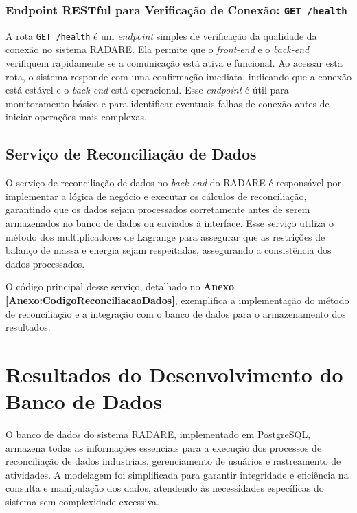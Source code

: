\subsubsection{Endpoint RESTful para Verificação de Conexão: \texttt{GET /health}}

A rota \texttt{GET /health} é um \textit{endpoint} simples de verificação da qualidade da conexão no sistema RADARE. Ela permite que o \textit{front-end} e o \textit{back-end} verifiquem rapidamente se a comunicação está ativa e funcional. Ao acessar esta rota, o sistema responde com uma confirmação imediata, indicando que a conexão está estável e o \textit{back-end} está operacional. Esse \textit{endpoint} é útil para monitoramento básico e para identificar eventuais falhas de conexão antes de iniciar operações mais complexas.

\subsection{Serviço de Reconciliação de Dados}

O serviço de reconciliação de dados no \textit{back-end} do RADARE é responsável por implementar a lógica de negócio e executar os cálculos de reconciliação, garantindo que os dados sejam processados corretamente antes de serem armazenados no banco de dados ou enviados à interface. Esse serviço utiliza o método dos multiplicadores de Lagrange para assegurar que as restrições de balanço de massa e energia sejam respeitadas, assegurando a consistência dos dados processados.

O código principal desse serviço, detalhado no \textbf{Anexo \ref{Anexo:CodigoReconciliacaoDados}}, exemplifica a implementação do método de reconciliação e a integração com o banco de dados para o armazenamento dos resultados.

\section{Resultados do Desenvolvimento do Banco de Dados}

O banco de dados do sistema RADARE, implementado em PostgreSQL, armazena todas as informações essenciais para a execução dos processos de reconciliação de dados industriais, gerenciamento de usuários e rastreamento de atividades. A modelagem foi simplificada para garantir integridade e eficiência na consulta e manipulação dos dados, atendendo às necessidades específicas do sistema sem complexidade excessiva.

